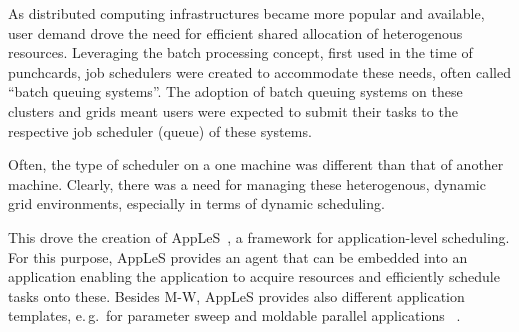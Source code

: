 \documentclass{sig-alternate}
\begin{document}
As distributed computing infrastructures became more popular and available,
user demand drove the need for efficient shared allocation of heterogenous
resources.
Leveraging the batch processing concept, first used in the time
of punchcards, job schedulers were created to accommodate these needs, often
called ``batch queuing systems''.
The adoption of batch queuing systems on these clusters and grids meant users
were expected to submit their tasks to the respective job scheduler (queue) of
these systems.

Often, the type of scheduler on a one machine was different than that of
another machine.
Clearly, there was a need for managing these heterogenous, dynamic grid
environments, especially in terms of dynamic scheduling.

This drove the creation of AppLeS~\cite{Berman:1996:apples}, a framework for
application-level scheduling.
For this purpose, AppLeS provides an agent that can be embedded into an
application enabling the application to acquire resources
and efficiently schedule tasks onto these.
Besides M-W, AppLeS provides also different application templates, e.\,g.\ for
parameter sweep and moldable parallel applications
~\cite{Berman:2003:ACG:766629.766632}.


%


%
%
\end{document}

